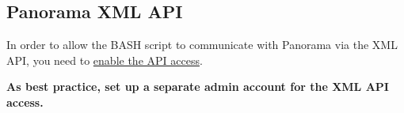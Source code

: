 \begin{Shaded}
\begin{Highlighting}[]
 \NormalTok{ \# }\NormalTok{, }  
  
 \KeywordTok{|}   
\end{Highlighting}
\end{Shaded}

\hypertarget{panorama-xml-api}{%
\subsection{Panorama XML API}\label{panorama-xml-api}}

In order to allow the BASH script to communicate with Panorama via the
XML API, you need to
\href{https://docs.paloaltonetworks.com/pan-os/10-2/pan-os-panorama-api/get-started-with-the-pan-os-xml-api/enable-api-access.html}{enable
the API access}.

\textbf{As best practice, set up a separate admin account for the XML
API access.}

